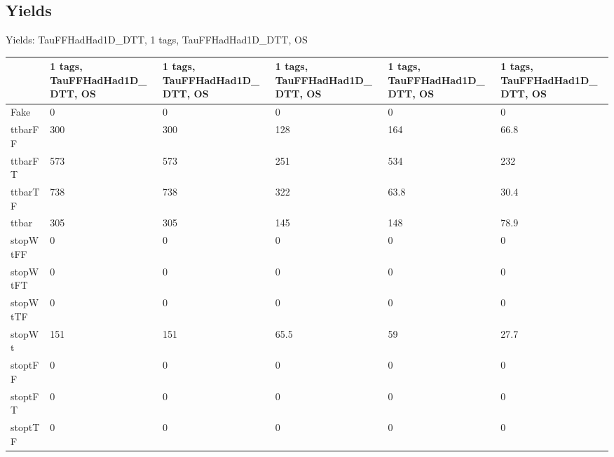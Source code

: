 
\subsection{Yields}

\begin{frame}{Yields: TauFFHadHad1D\_DTT, 1 tags, TauFFHadHad1D\_DTT, OS}
\begin{center}
  \begin{tabular}{l| >{\centering\let\newline\\\arraybackslash\hspace{0pt}}m{1.4cm}| >{\centering\let\newline\\\arraybackslash\hspace{0pt}}m{1.4cm}| >{\centering\let\newline\\\arraybackslash\hspace{0pt}}m{1.4cm}| >{\centering\let\newline\\\arraybackslash\hspace{0pt}}m{1.4cm}| >{\centering\let\newline\\\arraybackslash\hspace{0pt}}m{1.4cm}}
    & 1 tags, TauFFHadHad1D\_DTT, OS & 1 tags, TauFFHadHad1D\_DTT, OS & 1 tags, TauFFHadHad1D\_DTT, OS & 1 tags, TauFFHadHad1D\_DTT, OS & 1 tags, TauFFHadHad1D\_DTT, OS \\
 \hline \hline
    Fake& 0 & 0 & 0 & 0 & 0 \\
 \hline
    ttbarFF& 300 & 300 & 128 & 164 & 66.8 \\
 \hline
    ttbarFT& 573 & 573 & 251 & 534 & 232 \\
 \hline
    ttbarTF& 738 & 738 & 322 & 63.8 & 30.4 \\
 \hline
    ttbar& 305 & 305 & 145 & 148 & 78.9 \\
 \hline
    stopWtFF& 0 & 0 & 0 & 0 & 0 \\
 \hline
    stopWtFT& 0 & 0 & 0 & 0 & 0 \\
 \hline
    stopWtTF& 0 & 0 & 0 & 0 & 0 \\
 \hline
    stopWt& 151 & 151 & 65.5 & 59 & 27.7 \\
 \hline
    stoptFF& 0 & 0 & 0 & 0 & 0 \\
 \hline
    stoptFT& 0 & 0 & 0 & 0 & 0 \\
 \hline
    stoptTF& 0 & 0 & 0 & 0 & 0 \\

\end{tabular}
\end{center}
\end{frame}
